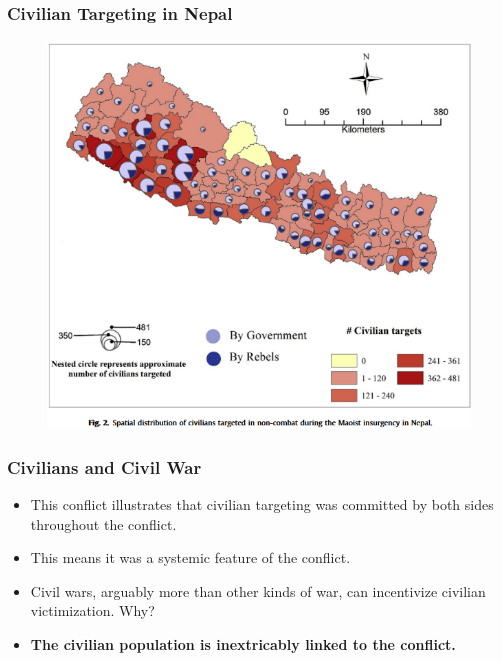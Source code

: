 \documentclass{beamer}
\begin{document}
\begin{frame} 
	\frametitle{\LARGE{Civilian Targeting in Nepal}}
	\begin{figure}[ht!]
		\centering
		\includegraphics[width=\textwidth,height=\textheight,keepaspectratio]{Nepalkillings.png}
	\end{figure}
\end{frame}

\begin{frame} 
	\frametitle{\LARGE{Civilians and Civil War}}
	\begin{itemize}
		\item This conflict illustrates that civilian targeting was committed by both sides throughout the conflict. \pause
		\item This means it was a systemic feature of the conflict. \pause
		\item Civil wars, arguably more than other kinds of war, can incentivize civilian victimization. Why? \pause
		\item \textbf{The civilian population is inextricably linked to the conflict.}
	\end{itemize}
\end{frame}
\end{document}
